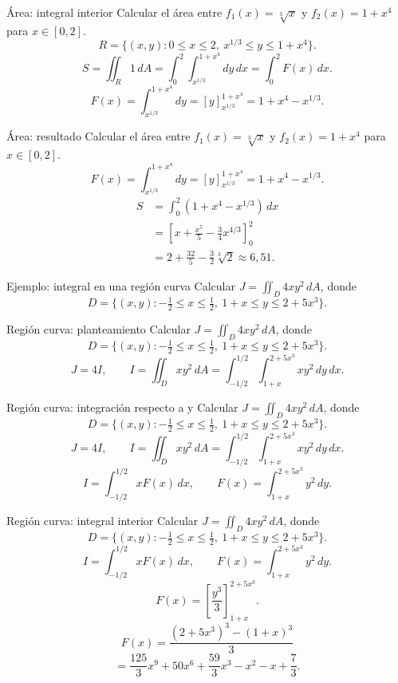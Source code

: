 \documentclass[original_version/main.tex]{subfiles}
\begin{document}
\begin{frame}{Área: integral interior}
\small Calcular el área entre $f_1(x)=\sqrt[3]{x}$ y $f_2(x)=1+x^4$ para $x\in[0,2]$.\[R=\{(x,y):0\le x\le2,\ x^{1/3}\le y\le1+x^4\}.\]\[S=\iint_R1\,dA=\int_0^2\int_{x^{1/3}}^{1+x^4}dy\,dx=\int_0^2 F(x)\,dx.\]\[F(x)=\int_{x^{1/3}}^{1+x^4}dy=[y]_{x^{1/3}}^{1+x^4}=1+x^4-x^{1/3}.\]
\end{frame}

\begin{frame}{Área: resultado}
\small Calcular el área entre $f_1(x)=\sqrt[3]{x}$ y $f_2(x)=1+x^4$ para $x\in[0,2]$.\[F(x)=\int_{x^{1/3}}^{1+x^4}dy=[y]_{x^{1/3}}^{1+x^4}=1+x^4-x^{1/3}.\]\begin{align*}S&=\int_0^2(1+x^4-x^{1/3})\,dx\\&=\left[x+\frac{x^5}{5}-\frac34x^{4/3}\right]_0^2\\&=2+\frac{32}{5}-\frac32\sqrt[3]2\approx6{,}51.\end{align*}
\end{frame}

\begin{frame}{Ejemplo: integral en una región curva}
\small Calcular $J=\iint_D4xy^2\,dA$, donde\[D=\{(x,y):-\tfrac12\le x\le\tfrac12,\ 1+x\le y\le2+5x^3\}.\]
\end{frame}

\begin{frame}{Región curva: planteamiento}
\small Calcular $J=\iint_D4xy^2\,dA$, donde\[D=\{(x,y):-\tfrac12\le x\le\tfrac12,\ 1+x\le y\le2+5x^3\}.\]\[J=4I,\qquad I=\iint_Dxy^2\,dA=\int_{-1/2}^{1/2}\int_{1+x}^{2+5x^3}xy^2\,dy\,dx.\]
\end{frame}

\begin{frame}{Región curva: integración respecto a y}
\small Calcular $J=\iint_D4xy^2\,dA$, donde\[D=\{(x,y):-\tfrac12\le x\le\tfrac12,\ 1+x\le y\le2+5x^3\}.\]\[J=4I,\qquad I=\iint_Dxy^2\,dA=\int_{-1/2}^{1/2}\int_{1+x}^{2+5x^3}xy^2\,dy\,dx.\]\[I=\int_{-1/2}^{1/2}xF(x)\,dx,\qquad F(x)=\int_{1+x}^{2+5x^3}y^2\,dy.\]
\end{frame}

\begin{frame}{Región curva: integral interior}
\small Calcular $J=\iint_D4xy^2\,dA$, donde\[D=\{(x,y):-\tfrac12\le x\le\tfrac12,\ 1+x\le y\le2+5x^3\}.\]\[I=\int_{-1/2}^{1/2}xF(x)\,dx,\qquad F(x)=\int_{1+x}^{2+5x^3}y^2\,dy.\]\[F(x)=\left[\frac{y^3}{3}\right]_{1+x}^{2+5x^3}.\]\[F(x)=\frac{(2+5x^3)^3-(1+x)^3}{3}\]\[=\frac{125}{3}x^9+50x^6+\frac{59}{3}x^3-x^2-x+\frac73.\]
\end{frame}
\end{document}
